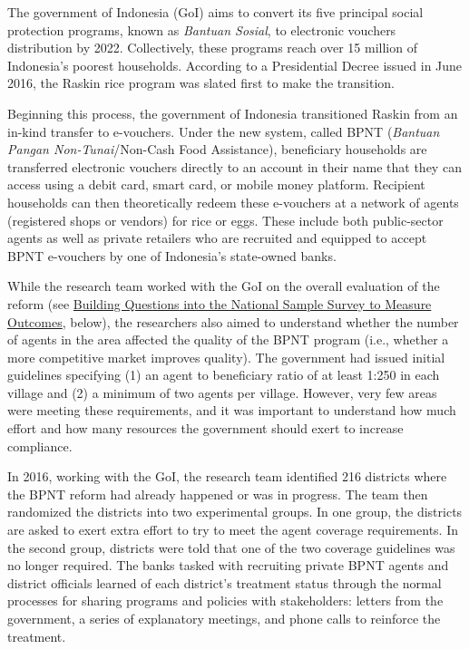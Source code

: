 The government of Indonesia (GoI) aims to convert its five principal social protection programs, known as \emph{Bantuan Sosial}, to electronic vouchers distribution by 2022. Collectively, these programs reach over 15 million of Indonesia's poorest households. According to a Presidential Decree issued in June 2016, the Raskin rice program was slated first to make the transition.

Beginning this process, the government of Indonesia transitioned Raskin from an in-kind transfer to e-vouchers. Under the new system, called BPNT (\emph{Bantuan Pangan Non-Tunai}/Non-Cash Food Assistance), beneficiary households are transferred electronic vouchers directly to an account in their name that they can access using a debit card, smart card, or mobile money platform. Recipient households can then theoretically redeem these e-vouchers at a network of agents (registered shops or vendors) for rice or eggs. These include both public-sector agents as well as private retailers who are recruited and equipped to accept BPNT e-vouchers by one of Indonesia's state-owned banks.

While the research team worked with the GoI on the overall evaluation of the reform (see \protect\hyperlink{building-questions-into-the-national-sample-survey-to-measure-outcomes}{Building Questions into the National Sample Survey to Measure Outcomes}, below), the researchers also aimed to understand whether the number of agents in the area affected the quality of the BPNT program (i.e., whether a more competitive market improves quality). The government had issued initial guidelines specifying (1) an agent to beneficiary ratio of at least 1:250 in each village and (2) a minimum of two agents per village. However, very few areas were meeting these requirements, and it was important to understand how much effort and how many resources the government should exert to increase compliance.

In 2016, working with the GoI, the research team identified 216 districts where the BPNT reform had already happened or was in progress. The team then randomized the districts into two experimental groups. In one group, the districts are asked to exert extra effort to try to meet the agent coverage requirements. In the second group, districts were told that one of the two coverage guidelines was no longer required. The banks tasked with recruiting private BPNT agents and district officials learned of each district's treatment status through the normal processes for sharing programs and policies with stakeholders: letters from the government, a series of explanatory meetings, and phone calls to reinforce the treatment.

